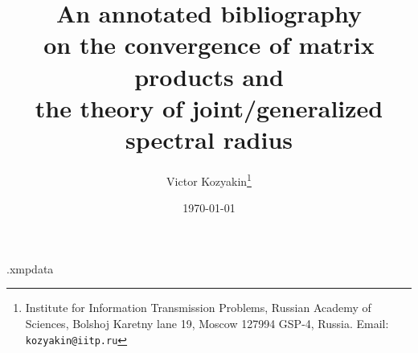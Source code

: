 %
\ifdefined\HCode\relax
\else
\begin{filecontents*}{\jobname.xmpdata}
\end{filecontents*}
\fi
\documentclass[a4paper,fleqn]{article}
%
\ifdefined\HCode\relax
\else
\usepackage[a-1b,mathxmp]{pdfx}
\fi
\usepackage{amsmath,amssymb,amsfonts,bm}
\usepackage[mathscr]{eucal}
\usepackage{a4wide}
%
\usepackage[numbers,sort,compress]{natbib}
\let\cite=\citep
\makeatletter
\makeatother
%
\usepackage{multicol}
\usepackage[small,firstabbrev]{authorindex}

\usepackage{hyperref}
\hypersetup{hypertexnames=false}



\immediate{}



\title{\bf An annotated bibliography\\ on the convergence of matrix products and\\ the theory of joint/generalized spectral radius}

\author{Victor Kozyakin\thanks{Institute for Information Transmission Problems, Russian Academy of Sciences, Bolshoj Karetny lane 19, Moscow 127994 GSP-4, Russia. Email: \texttt{kozyakin@iitp.ru}}}

\date{\today}

\maketitle

